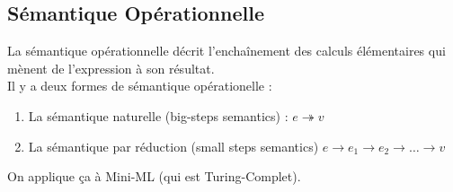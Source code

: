 \documentclass{cours}
\begin{document}
\subsection{Sémantique Opérationnelle}
La sémantique opérationnelle décrit l'enchaînement des calculs élémentaires qui mènent de l'expression à son résultat.\\
Il y a deux formes de sémantique opérationelle :
\begin{enumerate}
    \item La sémantique naturelle (big-steps semantics) : $e \twoheadrightarrow v$
    \item La sémantique par réduction (small steps semantics) $e \rightarrow e_{1} \rightarrow e_{2} \rightarrow \ldots \rightarrow v$
\end{enumerate}
On applique ça à Mini-ML (qui est Turing-Complet).
\end{document}
